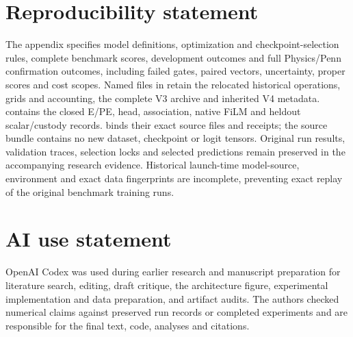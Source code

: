 \documentclass{article}
\begin{document}
\section*{Reproducibility statement}
The appendix specifies model definitions, optimization and checkpoint-selection rules, complete benchmark scores, development outcomes and full Physics/Penn confirmation outcomes, including failed gates, paired vectors, uncertainty, proper scores and cost scopes. Named files in  retain the relocated historical operations, grids and accounting, the complete V3 archive and inherited V4 metadata.  contains the closed E/PE, head, association, native FiLM and heldout scalar/custody records.  binds their exact source files and receipts; the source bundle contains no new dataset, checkpoint or logit tensors. Original run results, validation traces, selection locks and selected predictions remain preserved in the accompanying research evidence. Historical launch-time model-source, environment and exact data fingerprints are incomplete, preventing exact replay of the original benchmark training runs.

\section*{AI use statement}
OpenAI Codex was used during earlier research and manuscript preparation for literature search, editing, draft critique, the architecture figure, experimental implementation and data preparation, and artifact audits. The authors checked numerical claims against preserved run records or completed experiments and are responsible for the final text, code, analyses and citations.



\clearpage
\appendix
\renewcommand{\thesection}{A\arabic{section}}
\renewcommand{\theHsection}{appendix.\arabic{section}}
\renewcommand{\thefootnote}{\arabic{footnote}}

\end{document}
